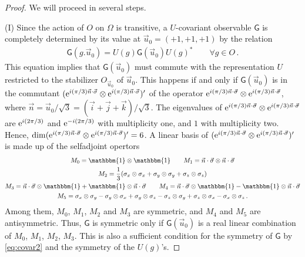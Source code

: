 \documentclass[12pt]{amsart}
\theoremstyle{definition}
\newcommand{\id}{\mathbbm{1}} %
\newcommand{\G}{\mathsf{G}}%
\newcommand{\e}{{\rm e}}
\begin{document}
\begin{proof}
We will proceed in several steps.

(I) Since the action of $O$ on $\Omega$ is transitive, a $U$-covariant observable $\G$ is completely determined by its value at $\vec{u}_0 = (+1,+1,+1)$ by the relation
\begin{align}
\G(g.\vec{u}_0) = U(g) \G(\vec{u}_0) U(g)^* \qquad \forall g\in O \,. \label{eq:covar2}
\end{align}
This equation implies that $\G(\vec{u}_0)$ must commute with the representation $U$ restricted to the stabilizer $O_{\vec{u}_0}$ of $\vec{u}_0$. This happens if and only if $\G(\vec{u}_0)$ is in the commutant $(\e^{i(\pi/3)\vec{n}\cdot\vec{\sigma}}\otimes\e^{i(\pi/3)\vec{n}\cdot\vec{\sigma}})'$ of the operator $\e^{i(\pi/3)\vec{n}\cdot\vec{\sigma}}\otimes\e^{i(\pi/3)\vec{n}\cdot\vec{\sigma}}$, where $\vec{n} = \vec{u}_0/\sqrt{3} = (\vec{i}+\vec{j}+\vec{k})/\sqrt{3}$. The eigenvalues of $\e^{i(\pi/3)\vec{n}\cdot\vec{\sigma}}\otimes\e^{i(\pi/3)\vec{n}\cdot\vec{\sigma}}$ are $\e^{i(2\pi/3)}$ and $\e^{-i(2\pi/3)}$ with multiplicity one, and $1$ with multiplicity two. Hence, $\dim (\e^{i(\pi/3)\vec{n}\cdot\vec{\sigma}}\otimes\e^{i(\pi/3)\vec{n}\cdot\vec{\sigma}})' = 6$. A linear basis of $(\e^{i(\pi/3)\vec{n}\cdot\vec{\sigma}}\otimes\e^{i(\pi/3)\vec{n}\cdot\vec{\sigma}})'$ is made up of the selfadjoint opertors
\begin{gather*}
M_0 = \id\otimes\id \qquad M_1 = \vec{n}\cdot\vec{\sigma}\otimes\vec{n}\cdot\vec{\sigma} \\
M_2 = \frac{1}{3}(\sigma_x\otimes\sigma_x + \sigma_y\otimes\sigma_y + \sigma_z\otimes\sigma_z) \\
M_3 = \vec{n}\cdot\vec{\sigma}\otimes\id + \id\otimes\vec{n}\cdot\vec{\sigma} \qquad
M_4 = \vec{n}\cdot\vec{\sigma}\otimes\id - \id\otimes\vec{n}\cdot\vec{\sigma} \\
M_5 = \sigma_x\otimes\sigma_y - \sigma_y\otimes\sigma_x + \sigma_y\otimes\sigma_z - \sigma_z\otimes\sigma_y + \sigma_z\otimes\sigma_x - \sigma_x\otimes\sigma_z \,.
\end{gather*}
Among them, $M_0$, $M_1$, $M_2$ and $M_3$ are symmetric, and $M_4$ and $M_5$ are antisymmetric. Thus, $\G$ is symmetric only if $\G(\vec{u}_0)$ is a real linear combination of $M_0$, $M_1$, $M_2$, $M_3$. This is also a sufficient condition for the symmetry of $\G$ by \eqref{eq:covar2} and the symmetry of the $U(g)$'s.


\end{proof}
\end{document}
